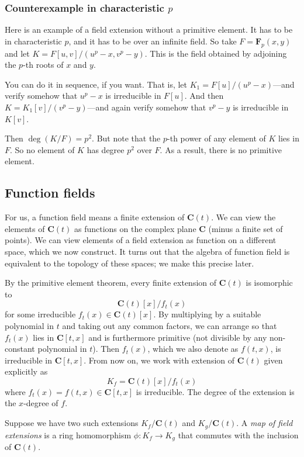 \documentclass[11pt]{article}
\begin{document}
\subsubsection{Counterexample in characteristic \(p\)}
\label{sec:org4dff48a}

Here is an example of a field extension without a primitive element.
It has to be in characteristic \(p\), and it has to be over an infinite field.
So take \(F = \mathbf{F}_p(x,y)\) and let \(K = F[u,v]/(u^p-x, v^p-y)\).
This is the field obtained by adjoining the \(p\)-th roots of \(x\) and \(y\).

You can do it in sequence, if you want. 
That is, let \(K_1 = F[u]/(u^p-x)\)---and verify somehow that \(u^p-x\) is irreducible in \(F[u]\).
And then \(K = K_1[v]/(v^p-y)\)---and again verify somehow that \(v^p-y\) is irreducible in \(K[v]\).

Then \(\deg(K/F) = p^2\).
But note that the \(p\)-th power of any element of \(K\) lies in \(F\).
So no element of \(K\) has degree \(p^2\) over \(F\).
As a result, there is no primitive element.
\subsection{Function fields}
\label{sec:org98fcc1a}
For us, a function field means a finite extension of \(\mathbf{C}(t)\).
We can view the elements of \(\mathbf{C}(t)\) as functions on the complex plane \(\mathbf{C}\) (minus a finite set of points).
We can view elements of a field extension as function on a different space, which we now construct.
It turns out that the algebra of function field is equivalent to the topology of these spaces; we make this precise later.

By the primitive element theorem, every finite extension of \(\mathbf{C}(t)\) is isomorphic to
\[ \mathbf{C}(t)[x]/f_t(x)\]
for some irreducible \(f_t(x) \in \mathbf{C}(t)[x]\).
By multiplying by a suitable polynomial in \(t\) and taking out any common factors, we can arrange so that \(f_t(x)\) lies in \(\mathbf{C}[t,x]\) and is furthermore primitive (not divisible by any non-constant polynomial in \(t\)).
Then \(f_t(x)\), which we also denote as \(f(t,x)\), is irreducible in \(\mathbf{C}[t,x]\).
From now on, we work with extension of \(\mathbf{C}(t)\) given explicitly as
\[ K_{f} = \mathbf{C}(t)[x]/f_t(x)\]
where \(f_t(x) = f(t,x)\in \mathbf{C}[t,x]\) is irreducible.
The degree of the extension is the \(x\)-degree of \(f\).

Suppose we have two such extensions \(K_f / \mathbf{C}(t)\) and \(K_g / \mathbf{C}(t)\).
A \emph{map of field extensions} is a ring homomorphism \(\phi \colon K_f \to K_g\) that commutes with the inclusion of \(\mathbf{C}(t)\).
\end{document}
